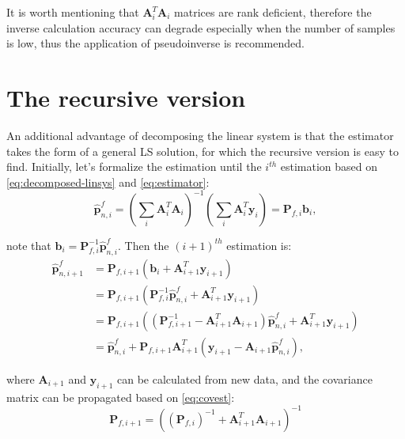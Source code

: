 It is worth mentioning that $\mathbf{A}_i^T\mathbf{A}_i$ matrices are rank deficient, therefore the inverse calculation accuracy can degrade especially when the number of samples is low, thus the application of pseudoinverse is recommended.

\section{The recursive version}

An additional advantage of decomposing the linear system is that the estimator takes the form of a general LS solution, for which the recursive version is easy to find. Initially, let's formalize the estimation until the $i^{th}$ estimation based on \eqref{eq:decomposed-linsys} and \eqref{eq:estimator}:
\begin{equation}
    \hat{\mathbf{p}}_{n, i}^f=\left(\sum_{i}\mathbf{A}_i^T\mathbf{A}_i\right)^{-1}\left(\sum_i\mathbf{A}_i^T\mathbf{y}_i\right) = \mathbf{P}_{f, i}\mathbf{b}_i,
\end{equation}

note that $\mathbf{b}_i=\mathbf{P}_{f, i}^{-1}\hat{\mathbf{p}}_{n, i}^f$. Then the $(i+1)^{th}$ estimation is:
\begin{equation}
\begin{aligned}
    \hat{\mathbf{p}}_{n, i+1}^f &= \mathbf{P}_{f, i+1}\left(\mathbf{b}_i + \mathbf{A}_{i+1}^T \mathbf{y}_{i+1}\right) \\ &=
    \mathbf{P}_{f, i+1}\left(\mathbf{P}_{f, i}^{-1}\hat{\mathbf{p}}_{n, i}^f + \mathbf{A}_{i+1}^T \mathbf{y}_{i+1}\right) \\ &=
    \mathbf{P}_{f, i+1}\left(\left(\mathbf{P}_{f, i+1}^{-1} - \mathbf{A}_{i+1}^T\mathbf{A}_{i+1}\right)\hat{\mathbf{p}}_{n, i}^f + \mathbf{A}_{i+1}^T \mathbf{y}_{i+1}\right) \\ &=
     \hat{\mathbf{p}}_{n, i}^f + \mathbf{P}_{f, i+1}\mathbf{A}_{i+1}^T\left( \mathbf{y}_{i+1} -\mathbf{A}_{i+1}\hat{\mathbf{p}}_{n, i}^f\right),
\end{aligned}
\end{equation}

where $\mathbf{A}_{i+1}$ and $\mathbf{y}_{i+1}$ can be calculated from new data, and the covariance matrix can be propagated based on \eqref{eq:covest}:
\begin{equation}
     \mathbf{P}_{f, i+1} = \left((\mathbf{P}_{f, i})^{-1}+\mathbf{A}_{i+1}^T\mathbf{A}_{i+1}\right)^{-1}
\end{equation}